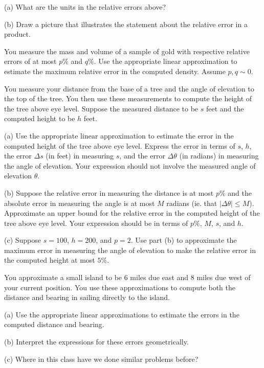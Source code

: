 \documentclass{ximera}
\begin{document}
\begin{question}   \label{Qefg547ji8}
(a) What are the units in the relative errors above?

(b) Draw a picture that illustrates the statement about the relative error in a product.
\end{question}
 
\begin{question}  \label{Qert5ty7}
You measure the mass and volume of a sample of gold with respective relative errors of at most $p\%$ and $q\%$. Use the appropriate linear approximation to estimate the maximum relative error in the computed density. Assume $p,q\sim 0$.

\end{question}



\begin{question}  \label{Qerfgghym}
You measure your distance from the base of a tree and the angle of elevation to the top of the tree. You then use these measurements to compute the height of the tree above eye level. Suppose the measured distance to be $s$ feet and the computed height to be $h$ feet.

(a) Use the appropriate linear approximation to estimate the error in the computed height of the tree above eye level. Express the error in terms of $s$, $h$, the error $\Delta s$ (in feet) in measuring $s$, and the error $\Delta \theta$ (in radians) in measuring the angle of elevation. Your expression should not involve the measured angle of elevation $\theta$.

(b) Suppose the relative error in measuring the distance is at most $p\%$ and the absolute error in measuring the angle is at most $M$ radians (ie. that $|\Delta \theta|\leq M$). Approximate an upper bound for the relative error in the computed height of the tree above eye level. Your expression should be in terms of  $p\%$, $M$, $s$, and $h$.            %

(c) Suppose $s=100$, $h=200$, and $p=2$. Use part (b) to approximate the maximum error in measuring the angle of elevation to make the relative error in the computed height at most $5\%$.
\end{question}


\begin{question}  \label{QE4gb4ttb}
You approximate a small island to be $6$ miles due east and $8$ miles due west of your current position. You use these approximations to compute both the distance and bearing in sailing directly to the island. 

(a) Use the appropriate linear approximations to estimate the errors in the computed distance and bearing.

(b) Interpret the expressions for these errors geometrically.

(c) Where in this class have we done similar problems before?

\end{question}
\end{document}
